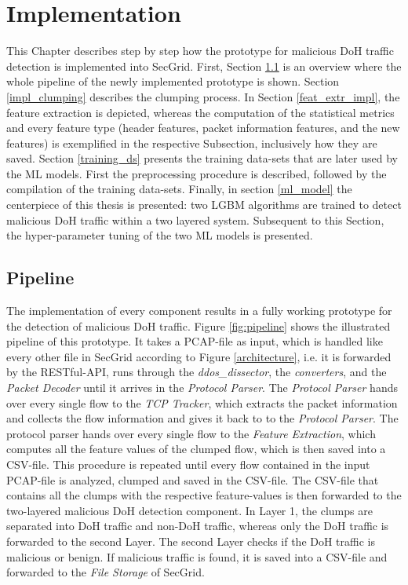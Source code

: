 \chapter{Implementation} \label{implementation}
This Chapter describes step by step how the prototype for malicious DoH traffic detection is implemented into SecGrid. First, Section \ref{pipeline} is an overview where the whole pipeline of the newly implemented prototype is shown. Section \ref{impl_clumping} describes the clumping process. In Section \ref{feat_extr_impl}, the feature extraction is depicted, whereas the computation of the statistical metrics and every feature type (header features, packet information features, and the new features) is exemplified in the respective Subsection, inclusively how they are saved. Section \ref{training_ds} presents the training data-sets that are later used by the ML models. First the preprocessing procedure is described, followed by the compilation of the training data-sets. Finally, in section \ref{ml_model} the centerpiece of this thesis is presented: two LGBM algorithms are trained to detect malicious DoH traffic within a two layered system. Subsequent to this Section, the hyper-parameter tuning of the two ML models is presented. 

\section{Pipeline} \label{pipeline}
The implementation of every component results in a fully working prototype for the detection of malicious DoH traffic. Figure \ref{fig:pipeline} shows the illustrated pipeline of this prototype. It takes a PCAP-file as input, which is handled like every other file in SecGrid according to Figure \ref{architecture}, i.e. it is forwarded by the RESTful-API, runs through the \textit{ddos\_dissector}, the \textit{converters}, and the \textit{Packet Decoder} until it arrives in the \textit{Protocol Parser}. The \textit{Protocol Parser} hands over every single flow to the \textit{TCP Tracker}, which extracts the packet information and collects the flow information and gives it back to to the \textit{Protocol Parser}. The protocol parser hands over every single flow to the \textit{Feature Extraction}, which computes all the feature values of the clumped flow, which is then saved into a CSV-file. This procedure is repeated until every flow contained in the input PCAP-file is analyzed, clumped and saved in the CSV-file. The CSV-file that contains all the clumps with the respective feature-values is then forwarded to the two-layered malicious DoH detection component. In Layer 1, the clumps are separated into DoH traffic and non-DoH traffic, whereas only the DoH traffic is forwarded to the second Layer. The second Layer checks if the DoH traffic is malicious or benign. If malicious traffic is found, it is saved into a CSV-file and forwarded to the \textit{File Storage} of SecGrid.

